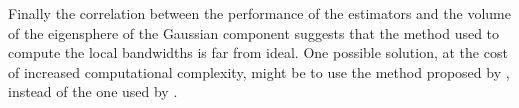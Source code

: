 Finally the correlation between the performance of the estimators and the volume of the eigensphere of the Gaussian component suggests that the method used to compute the local bandwidths is far from ideal. 
One possible solution, at the cost of increased computational complexity, might be to use the method proposed by \citeauthor{breiman1977variable}, instead of the one used by \citeauthor{ferdosi2011comparison}.